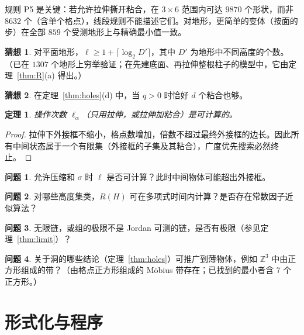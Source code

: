 \documentclass[11pt,a4paper]{article}
\theoremstyle{plain}
\newtheorem{theorem}{定理}
\theoremstyle{definition}
\newtheorem{conjecture}{猜想}
\newtheorem{problem}{问题}
\theoremstyle{remark}
\newcommand{\Z}{\mathbb{Z}}
\begin{document}
规则 P5 是关键：若允许拉伸撕开粘合，在 $3\times6$ 范围内可达 $9870$ 个形状，而非 $8632$ 个（含单个格点），线段规则不能描述它们。对地形，更简单的变体（按面的步）在全部 $859$ 个受测地形上与精确最小值一致。

\begin{conjecture}
对平面地形，$\ell\ge1+\lceil\log_2 D'\rceil$，其中 $D'$ 为地形中不同高度的个数。（已在 $1307$ 个地形上穷举验证；在先建底面、再拉伸整根柱子的模型中，它由定理~\ref{thm:R}(a) 得出。）
\end{conjecture}

\begin{conjecture}
在定理~\ref{thm:holes}(d) 中，当 $q>0$ 时恰好 $d$ 个粘合也够。
\end{conjecture}

\begin{theorem}\label{thm:dec}
操作次数 $\ell_\alpha$（只用拉伸，或拉伸加粘合）是可计算的。
\end{theorem}
\begin{proof}
拉伸下外接框不缩小，格点数增加，倍数不超过最终外接框的边长。因此所有中间状态属于一个有限集（外接框的子集及其粘合），广度优先搜索必然终止。
\end{proof}

\begin{problem}
允许压缩和 $\sigma$ 时 $\ell$ 是否可计算？此时中间物体可能超出外接框。
\end{problem}

\begin{problem}
对哪些高度集类，$R(H)$ 可在多项式时间内计算？是否存在常数因子近似算法？
\end{problem}

\begin{problem}\label{pr:limit}
无限链，或组的极限不是 Jordan 可测的链，是否有极限（参见定理~\ref{thm:limit}）？
\end{problem}

\begin{problem}
关于洞的哪些结论（定理~\ref{thm:holes}）可推广到薄物体，例如 $\Z^3$ 中由正方形组成的带？（由格点正方形组成的 Möbius 带存在；已找到的最小者含 7 个正方形。）
\end{problem}

\section{形式化与程序}\label{sec:formal}
\end{document}
